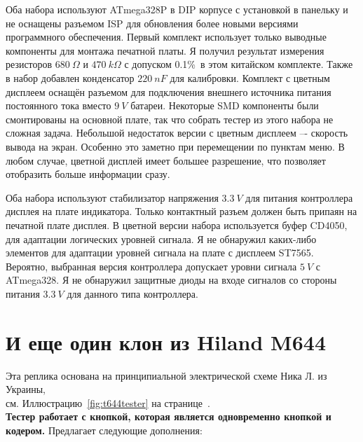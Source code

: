 Оба набора используют ATmega328P в DIP корпусе с установкой в панельку и
не оснащены разъемом ISP для обновления более новыми версиями программного обеспечения.
Первый комплект использует только выводные компоненты для монтажа печатной платы.
Я получил результат измерения резисторов \(680~\Omega\) и \(470~k\Omega\) с допуском 0.1\%\ в
этом китайском комплекте.
Также в набор добавлен конденсатор \(220~nF\) для калибровки.
Комплект с цветным дисплеем оснащён разъемом для подключения внешнего источника питания постоянного тока
вместо \(9~V\) батареи.
Некоторые SMD компоненты были смонтированы на основной плате, так что собрать тестер 
из этого набора не сложная задача.
Небольшой недостаток версии с цветным дисплеем –- скорость вывода на экран.
Особенно это заметно при  перемещении по пунктам меню.
В любом случае, цветной дисплей имеет большее разрешение, что позволяет отобразить больше информации сразу.

Оба набора используют стабилизатор напряжения \(3.3~V\) для питания контроллера
дисплея на плате индикатора.
Только контактный разъем должен быть припаян на печатной плате дисплея.
В цветной версии набора используется буфер CD4050, для адаптации логических уровней сигнала.
Я не обнаружил каких-либо элементов для адаптации уровней сигнала на плате с дисплеем ST7565.
Вероятно, выбранная версия контроллера допускает уровни сигнала \(5~V\) с ATmega328.
Я не обнаружил защитные диоды на входе сигналов со стороны питания \(3.3~V\) для данного типа контроллера.
\section{И еще один клон из Hiland M644}
Эта реплика основана на принципиальной электрической схеме Ника Л. из Украины,
\\см. Иллюстрацию~\ref{fig:t644tester} на странице~\pageref{fig:t644tester}.\\
\textbf{ Тестер работает с кнопкой, которая является одновременно кнопкой и кодером.}
Предлагает следующие дополнения:

